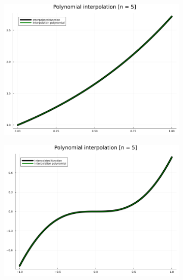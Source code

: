 \documentclass[11pt]{article}
\begin{document}
        \begin{figure}[htbp]
        \centering
            \begin{subfigure}[b]{0.45\textwidth}
                \includegraphics[width=\linewidth]{img/ex5_f1_n5.png}
            \end{subfigure}
            \hfill
            \begin{subfigure}[b]{0.45\textwidth}
                \includegraphics[width=\linewidth]{img/ex5_f2_n5.png}
            \end{subfigure}
            \begin{subfigure}[b]{0.45\textwidth}

\end{subfigure}
\end{figure}
\end{document}

